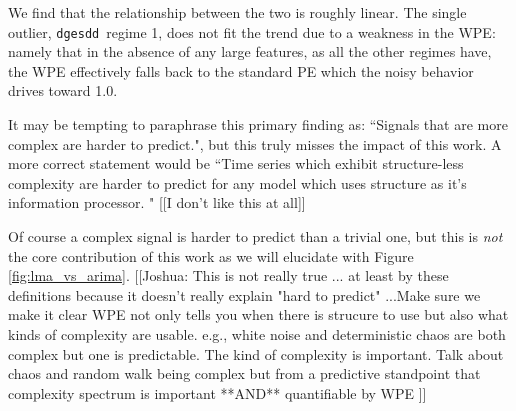 \documentclass{article}
\newcommand{\svd}{{\tt dgesdd}~}
\newcommand{\col}{{\tt col\_major}~}
\begin{document}

















We find that the relationship between the two is roughly linear. The single
outlier, \svd regime 1, does not fit the trend due to a weakness in the WPE:
namely that in the absence of any large features, as all the other regimes have,
the WPE effectively falls back to the standard PE which the noisy behavior
drives toward 1.0.



It may be tempting to paraphrase this primary finding as: ``Signals that are more complex are harder to predict.", but this truly misses the impact of this work. A more correct statement would be ``Time series which exhibit structure-less complexity are harder to predict for any model which uses structure as it's information processor. " [[I don't like this at all]] 




Of course a complex signal is harder to predict than a trivial one, but this is \emph{not} the core contribution of this work as we will elucidate with Figure \ref{fig:lma_vs_arima}. [[Joshua: This is not really true ... at least by these definitions because it doesn't really explain "hard to predict" ...Make sure we make it clear WPE not only tells you when there is strucure to use but also what kinds of complexity are usable. e.g., white noise and deterministic chaos are both complex but one is predictable. The kind of complexity is important. Talk about chaos and random walk being complex but from a predictive standpoint that complexity spectrum is important **AND** quantifiable by WPE ]]
\end{document}
